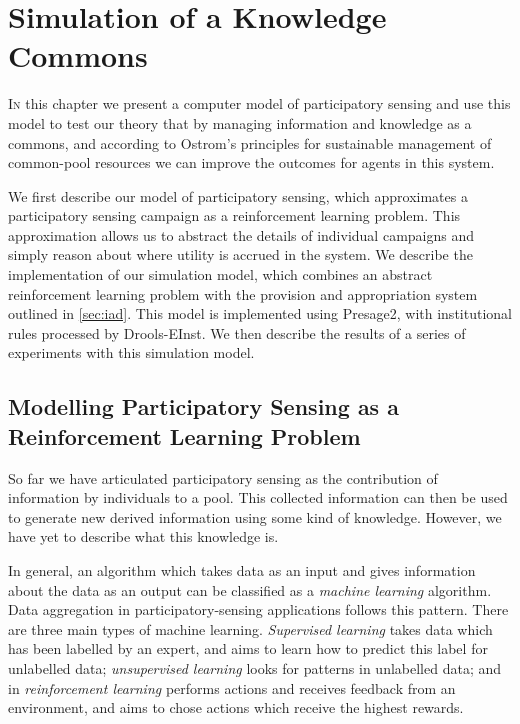 \acresetall
\chapter{Simulation of a Knowledge Commons}\label{ch:results}

\lettrine[lines=3]{I}{n} this chapter we present a computer model of participatory sensing and use
this model to test our theory that by managing information and knowledge as a
commons, and according to Ostrom's principles for sustainable management of
common-pool resources we can improve the outcomes for agents in this system.

We first describe our model of participatory sensing, which approximates a
participatory sensing campaign as a reinforcement learning problem. This
approximation allows us to abstract the details of individual campaigns and
simply reason about where utility is accrued in the system.  We describe the
implementation of our simulation model, which combines an abstract
reinforcement learning problem with the provision and appropriation system
outlined in \autoref{sec:iad}. This model is implemented using Presage2, with
institutional rules processed by Drools-EInst. We then describe the results of
a series of experiments with this simulation model.

\section{Modelling Participatory Sensing as a Reinforcement Learning Problem}

So far we have articulated participatory sensing as the contribution of
information by individuals to a pool. This collected information can then be
used to generate new derived information using some kind of knowledge.
However, we have yet to describe what this knowledge is.

In general, an algorithm which takes data as an input and gives information
about the data as an output can be classified as a \emph{machine learning}
algorithm. Data aggregation in participatory-sensing applications follows this
pattern. There are three main types of machine learning. \emph{Supervised
learning} takes data which has been labelled by an expert, and aims to learn
how to predict this label for unlabelled data; \emph{unsupervised learning}
looks for patterns in unlabelled data; and in \emph{reinforcement learning}
performs actions and receives feedback from an environment, and aims to chose
actions which receive the highest rewards.

